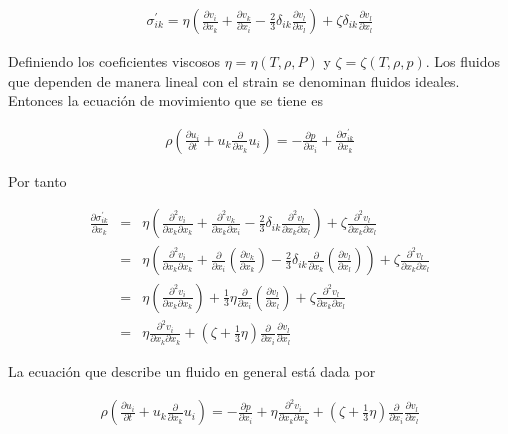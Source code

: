 \begin{eqnarray}
\sigma^{'}_{ik} = \eta\left(\frac{\partial v_{i}}{\partial x_{k}} + \frac{\partial v_{k}}{\partial x_{i}} - \frac{2}{3}\delta_{ik}\frac{\partial v_{l}}{\partial x_{l}}\right) + \zeta\delta_{ik}\frac{\partial v_{l}}{\partial x_{l}}
\end{eqnarray}

\noindent  Definiendo los coeficientes viscosos $\eta = \eta(T,\rho,P)$ y $\zeta=\zeta(T,\rho,p)$. Los fluidos que dependen de manera lineal con el strain \cite{Landau} se denominan fluidos ideales. Entonces la ecuación de movimiento que se tiene es

\begin{eqnarray}
\rho\left(\frac{\partial u_{i}}{\partial t} + u_{k}\frac{\partial}{\partial x_{k}}u_{i}\right) = -\frac{\partial p}{\partial x_{i}} + \frac{\partial \sigma^{'}_{ik}}{\partial x_{k}}
\end{eqnarray}

\noindent Por tanto

\begin{eqnarray}
\frac{\partial \sigma^{'}_{ik}}{\partial x_{k}} &=& \eta\left(\frac{\partial^{2} v_{i}}{\partial x_{k}\partial x_{k}}+ \frac{\partial^{2} v_{k}}{\partial x_{k}\partial x_{i}}-\frac{2}{3}\delta_{ik} \frac{\partial^{2} v_{l}}{\partial x_{k} \partial x_{l}}\right)+\zeta \frac{\partial^{2} v_{l}}{\partial x_{k}\partial x_{l}}\nonumber \\
&=&\eta\left(\frac{\partial^{2} v_{i}}{\partial x_{k}\partial x_{k}} + \frac{\partial}{\partial x_{i}}\left(\frac{\partial v_{k}}{\partial x_{k}}\right)-\frac{2}{3}\delta_{ik}\frac{\partial}{\partial x_{k}}\left(\frac{\partial v_{l}}{\partial x_{l}}\right)\right) + \zeta \frac{\partial^{2} v_{l}}{\partial x_{k}\partial x_{l}}\nonumber \\
&=& \eta\left(\frac{\partial^{2} v_{i}}{\partial x_{k}\partial x_{k}}\right) + \frac{1}{3}\eta\frac{\partial}{\partial x_{i}}\left(\frac{\partial v_{l}}{\partial x_{l}}\right)+ \zeta \frac{\partial^{2} v_{l}}{\partial x_{k}\partial x_{l}}\nonumber \\
&=& \eta\frac{\partial^{2} v_{i}}{\partial x_{k}\partial x_{k}} + \left(\zeta + \frac{1}{3}\eta\right)\frac{\partial}{\partial x_{i}}\frac{\partial v_{l}}{\partial x_{l}}
\end{eqnarray}


\noindent La ecuación que describe un fluido en general está dada por 

\begin{eqnarray}
\rho\left(\frac{\partial u_{i}}{\partial t} + u_{k}\frac{\partial}{\partial x_{k}}u_{i}\right) = -\frac{\partial p}{\partial x_{i}} + \eta\frac{\partial^{2} v_{i}}{\partial x_{k}\partial x_{k}} + \left(\zeta + \frac{1}{3}\eta\right)\frac{\partial}{\partial x_{i}}\frac{\partial v_{l}}{\partial x_{l}}
\end{eqnarray}


